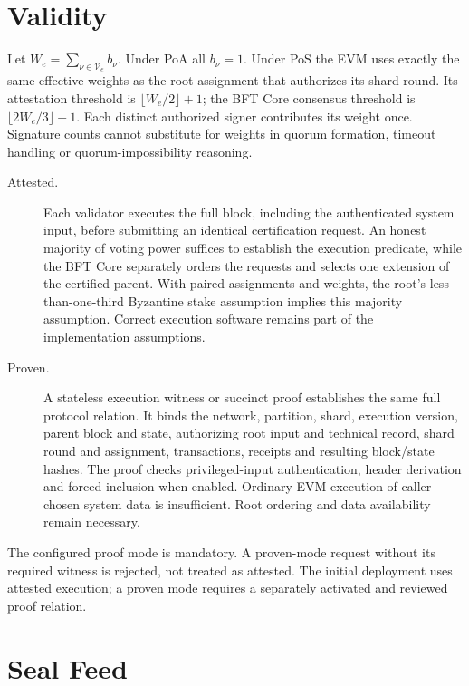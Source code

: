 \section{Validity}\label{sec:evm-validity}

Let $W_e=\sum_{\nu\in\mathcal{V}_e}b_\nu$. Under PoA all $b_\nu=1$. Under PoS the EVM uses exactly the same effective weights as the root assignment that authorizes its shard round. Its attestation threshold is $\lfloor W_e/2\rfloor+1$; the BFT Core consensus threshold is $\lfloor2W_e/3\rfloor+1$. Each distinct authorized signer contributes its weight once. Signature counts cannot substitute for weights in quorum formation, timeout handling or quorum-impossibility reasoning.

\begin{description}
 \item[Attested.] Each validator executes the full block, including the authenticated system input, before submitting an identical certification request. An honest majority of voting power suffices to establish the execution predicate, while the BFT Core separately orders the requests and selects one extension of the certified parent. With paired assignments and weights, the root's less-than-one-third Byzantine stake assumption implies this majority assumption. Correct execution software remains part of the implementation assumptions.
 \item[Proven.] A stateless execution witness or succinct proof establishes the same full protocol relation. It binds the network, partition, shard, execution version, parent block and state, authorizing root input and technical record, shard round and assignment, transactions, receipts and resulting block/state hashes. The proof checks privileged-input authentication, header derivation and forced inclusion when enabled. Ordinary EVM execution of caller-chosen system data is insufficient. Root ordering and data availability remain necessary.
\end{description}

The configured proof mode is mandatory. A proven-mode request without its required witness is rejected, not treated as attested. The initial deployment uses attested execution; a proven mode requires a separately activated and reviewed proof relation.

\section{Seal Feed}\label{sec:evm-seal-feed}

